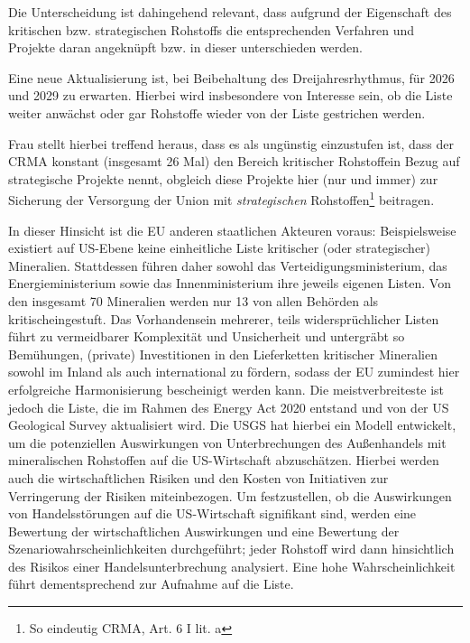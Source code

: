 \documentclass[12pt,a4paper,oneside]{book} %
\begin{document}
Die Unterscheidung ist dahingehend relevant, dass aufgrund der Eigenschaft des kritischen bzw. strategischen Rohstoffs die entsprechenden Verfahren und Projekte daran angeknüpft bzw. in dieser unterschieden werden.

Eine neue Aktualisierung ist, bei Beibehaltung des Dreijahresrhythmus, für 2026 und 2029 zu erwarten. Hierbei wird insbesondere von Interesse sein, ob die Liste weiter anwächst oder gar Rohstoffe wieder von der Liste gestrichen werden.

Frau\autocite{Frau 2024, NVwZ 2024, 1874, 1875} stellt hierbei treffend heraus, dass es als ungünstig einzustufen ist, dass der CRMA konstant (insgesamt 26 Mal) den \glqq Bereich kritischer Rohstoffe\grqq in Bezug auf strategische Projekte nennt, obgleich diese Projekte hier (nur und immer) zur \glqq Sicherung der Versorgung der Union mit \textit{strategischen} Rohstoffen\grqq\footnote{So eindeutig CRMA, Art. 6 I lit. a} beitragen.


In dieser Hinsicht ist die EU anderen staatlichen Akteuren voraus: Beispielsweise existiert auf US-Ebene keine einheitliche Liste kritischer (oder strategischer) Mineralien. Stattdessen führen daher sowohl das Verteidigungsministerium, das Energieministerium sowie das Innenministerium ihre jeweils eigenen Listen. Von den insgesamt 70 Mineralien werden nur 13 von allen Behörden als \glqq kritisch\grqq eingestuft.\autocite{Baskaran, G.; Schwart, M.: Three U.S. Government Lists: Which Minerals Are the Most Critical?, CSIS} Das Vorhandensein mehrerer, teils widersprüchlicher Listen führt zu vermeidbarer Komplexität und Unsicherheit und untergräbt so Bemühungen, (private) Investitionen in den Lieferketten kritischer Mineralien sowohl im Inland als auch international zu fördern, sodass der EU zumindest hier erfolgreiche Harmonisierung bescheinigt werden kann.
Die meistverbreiteste ist jedoch die Liste, die im Rahmen des Energy Act 2020 entstand und von der US Geological Survey aktualisiert wird. Die USGS hat hierbei ein Modell entwickelt, um die potenziellen Auswirkungen von Unterbrechungen des Außenhandels mit mineralischen Rohstoffen auf die US-Wirtschaft abzuschätzen. Hierbei werden auch die wirtschaftlichen Risiken und den Kosten von Initiativen zur Verringerung der Risiken miteinbezogen. Um festzustellen, ob die Auswirkungen von Handelsstörungen auf die US-Wirtschaft signifikant sind, werden eine Bewertung der wirtschaftlichen Auswirkungen und eine Bewertung der Szenariowahrscheinlichkeiten durchgeführt; jeder Rohstoff wird dann hinsichtlich des Risikos einer Handelsunterbrechung analysiert. Eine hohe Wahrscheinlichkeit führt dementsprechend zur Aufnahme auf die Liste.
\end{document}
